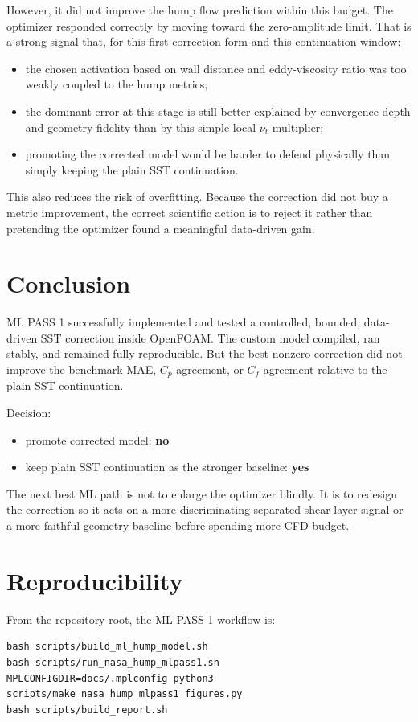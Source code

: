 \documentclass[11pt]{article}
\begin{document}
However, it did not improve the hump flow prediction within this budget. The optimizer responded correctly by moving toward the zero-amplitude limit. That is a strong signal that, for this first correction form and this continuation window:
\begin{itemize}
\item the chosen activation based on wall distance and eddy-viscosity ratio was too weakly coupled to the hump metrics;
\item the dominant error at this stage is still better explained by convergence depth and geometry fidelity than by this simple local \(\nu_t\) multiplier;
\item promoting the corrected model would be harder to defend physically than simply keeping the plain SST continuation.
\end{itemize}

This also reduces the risk of overfitting. Because the correction did not buy a metric improvement, the correct scientific action is to reject it rather than pretending the optimizer found a meaningful data-driven gain.

\section{Conclusion}
ML PASS 1 successfully implemented and tested a controlled, bounded, data-driven SST correction inside OpenFOAM. The custom model compiled, ran stably, and remained fully reproducible. But the best nonzero correction did not improve the benchmark MAE, \(C_p\) agreement, or \(C_f\) agreement relative to the plain SST continuation.

Decision:
\begin{itemize}
\item promote corrected model:
  \textbf{no}
\item keep plain SST continuation as the stronger baseline:
  \textbf{yes}
\end{itemize}

The next best ML path is not to enlarge the optimizer blindly. It is to redesign the correction so it acts on a more discriminating separated-shear-layer signal or a more faithful geometry baseline before spending more CFD budget.

\section{Reproducibility}
From the repository root, the ML PASS 1 workflow is:
\begin{lstlisting}
bash scripts/build_ml_hump_model.sh
bash scripts/run_nasa_hump_mlpass1.sh
MPLCONFIGDIR=docs/.mplconfig python3 scripts/make_nasa_hump_mlpass1_figures.py
bash scripts/build_report.sh
\end{lstlisting}



\end{document}
